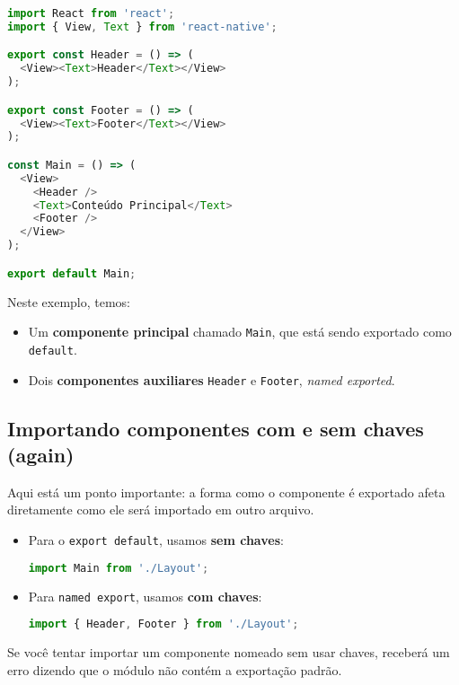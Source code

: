 \begin{lstlisting}[language=JavaScript, caption={Vários componentes no mesmo arquivo}]
import React from 'react';
import { View, Text } from 'react-native';

export const Header = () => (
  <View><Text>Header</Text></View>
);

export const Footer = () => (
  <View><Text>Footer</Text></View>
);

const Main = () => (
  <View>
    <Header />
    <Text>Conteúdo Principal</Text>
    <Footer />
  </View>
);

export default Main;
\end{lstlisting}

Neste exemplo, temos:

\begin{itemize}
  \item Um \textbf{componente principal} chamado \texttt{Main}, que está sendo exportado como \texttt{default}.
  \item Dois \textbf{componentes auxiliares} \texttt{Header} e \texttt{Footer}, \textit{named exported}.
\end{itemize}

\subsection*{Importando componentes com e sem chaves (again)}

Aqui está um ponto importante: a forma como o componente é exportado afeta diretamente como ele será importado em outro arquivo.

\begin{itemize}
  \item Para o \texttt{export default}, usamos \textbf{sem chaves}:
  \begin{lstlisting}[language=JavaScript]
import Main from './Layout';
  \end{lstlisting}

  \item Para \texttt{named export}, usamos \textbf{com chaves}:
  \begin{lstlisting}[language=JavaScript]
import { Header, Footer } from './Layout';
  \end{lstlisting}
\end{itemize}

Se você tentar importar um componente nomeado sem usar chaves, receberá um erro dizendo que o módulo não contém a exportação padrão\cite{rocketseatExports}.


